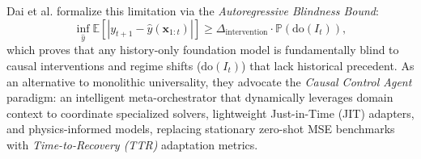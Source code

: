 \begin{itemize}[leftmargin=*]
    Dai et al. formalize this limitation via the \emph{Autoregressive Blindness Bound}:
    \begin{equation}
        \inf_{\hat{y}} \mathbb{E}\left[|y_{t+1} - \hat{y}(\mathbf{x}_{1:t})|\right] \ge \Delta_{\text{intervention}} \cdot \mathbb{P}\left(\text{do}(I_t)\right),
    \end{equation}
    which proves that any history-only foundation model is fundamentally blind to causal interventions and regime shifts ($\text{do}(I_t)$) that lack historical precedent. As an alternative to monolithic universality, they advocate the \emph{Causal Control Agent} paradigm: an intelligent meta-orchestrator that dynamically leverages domain context to coordinate specialized solvers, lightweight Just-in-Time (JIT) adapters, and physics-informed models, replacing stationary zero-shot MSE benchmarks with \emph{Time-to-Recovery (TTR)} adaptation metrics.
\end{itemize}

